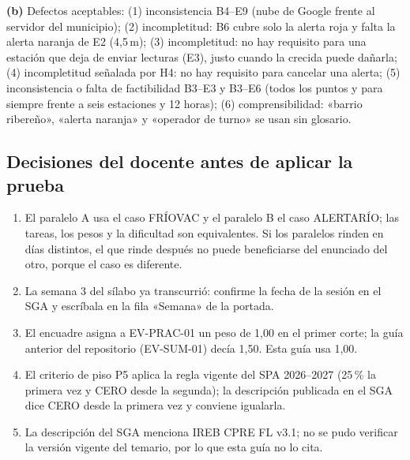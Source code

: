 \documentclass[11pt]{article}
\newcommand{\subseccion}[1]{\subsection{\textcolor{midblue}{#1}}}
\begin{document}
	\textbf{(b)} Defectos aceptables: (1) inconsistencia B4--E9 (nube de Google frente al servidor del municipio); (2) incompletitud: B6 cubre solo la alerta roja y falta la alerta naranja de E2 (4,5\,m); (3) incompletitud: no hay requisito para una estación que deja de enviar lecturas (E3), justo cuando la crecida puede dañarla; (4) incompletitud señalada por H4: no hay requisito para cancelar una alerta; (5) inconsistencia o falta de factibilidad B3--E3 y B3--E6 (todos los puntos y para siempre frente a seis estaciones y 12 horas); (6) comprensibilidad: «barrio ribereño», «alerta naranja» y «operador de turno» se usan sin glosario.
	
	\subseccion{Decisiones del docente antes de aplicar la prueba}
	
	\begin{enumerate}[leftmargin=18pt,itemsep=2pt]
		\item El paralelo A usa el caso FRÍOVAC y el paralelo B el caso ALERTARÍO; las tareas, los pesos y la dificultad son equivalentes. Si los paralelos rinden en días distintos, el que rinde después no puede beneficiarse del enunciado del otro, porque el caso es diferente.
		\item La semana 3 del sílabo ya transcurrió: confirme la fecha de la sesión en el SGA y escríbala en la fila «Semana» de la portada.
		\item El encuadre asigna a EV-PRAC-01 un peso de 1,00 en el primer corte; la guía anterior del repositorio (EV-SUM-01) decía 1,50. Esta guía usa 1,00.
		\item El criterio de piso P5 aplica la regla vigente del SPA 2026--2027 (25\,\% la primera vez y CERO desde la segunda); la descripción publicada en el SGA dice CERO desde la primera vez y conviene igualarla.
		\item La descripción del SGA menciona IREB CPRE FL v3.1; no se pudo verificar la versión vigente del temario, por lo que esta guía no lo cita.
	\end{enumerate}
	
	\fi
	
	
	
	
\end{document}
